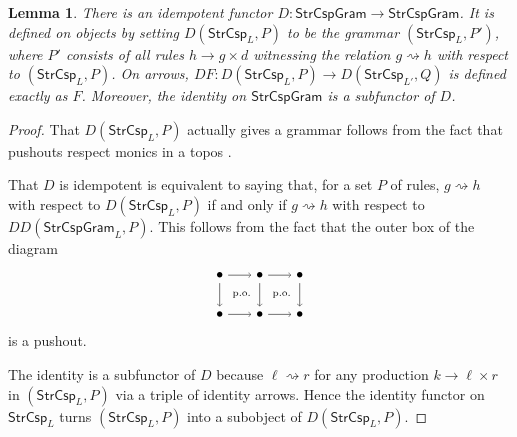 \documentclass{amsart}
\newcommand{\StrCsp}{\cat{StrCsp}}
\newcommand{\StrCspGram}{\cat{StrCspGram}}
\newcommand{\cat}[1]{\mathsf{#1}}
\newcommand{\from}{\colon}
\newcommand{\dderiv}[2]{#1 \rightsquigarrow #2}
\newcommand{\spn}[3]{#2 \to #1 \times #3}
\newtheorem{lemma}[theorem]{Lemma}
\theoremstyle{remark}
\theoremstyle{definition}
\begin{document}
\begin{lemma}
  There is an idempotent functor
  $ D \from \StrCspGram \to \StrCspGram $. It is defined on objects by
  setting $ D ( \StrCsp_L , P ) $ to be the grammar
  $ ( \StrCsp_L , P') $, where $ P' $ consists of all rules
  $ \spn{g}{h}{d} $ witnessing the relation $ \dderiv{g}{h} $ with
  respect to $ ( \StrCsp_L , P ) $. On arrows,
  $ DF \from D( \StrCsp_L , P ) \to D( \StrCsp_{L'} , Q ) $ is defined
  exactly as $ F $.  Moreover, the identity on $ \StrCspGram $ is a
  subfunctor of $ D $.
\end{lemma}

%
% 

\begin{proof}
  That $ D ( \StrCsp_L , P ) $ actually gives a grammar follows from the
  fact that pushouts respect monics in a topos
  \cite[Lem.~12]{LackSobo_Adhesive}.
  
  That $ D $ is idempotent is equivalent to saying that, for a set
  $ P $ of rules, $ \dderiv{g}{h} $ with respect to
  $ D ( \StrCsp_L , P ) $ if and only if $ \dderiv{g}{h} $ with
  respect to $ DD ( \StrCspGram_L , P ) $. This follows from the fact
  that the outer box of the diagram
    \[
      \begin{tikzpicture}
        \node (1) at (0,1) {\( \bullet \)};
        \node (2) at (1,1) {\( \bullet \)};
        \node (3) at (2,1) {\( \bullet \)};
        \node (4) at (0,0) {\( \bullet \)};
        \node (5) at (1,0) {\( \bullet \)};
        \node (6) at (2,0) {\( \bullet \)};
        \draw [->] (1) to node [] {\scriptsize{\(  \)}} (2);
        \draw [->] (2) to node [] {\scriptsize{\(  \)}} (3);
        \draw [->] (4) to node [] {\scriptsize{\(  \)}} (5);
        \draw [->] (5) to node [] {\scriptsize{\(  \)}} (6);
        \draw [->] (1) to node [] {\scriptsize{\(  \)}} (4);
        \draw [->] (2) to node [] {\scriptsize{\(  \)}} (5);
        \draw [->] (3) to node [] {\scriptsize{\(  \)}} (6);
        \node () at (0.5,0.5) {\scriptsize{ p.o.\ }};
        \node () at (1.5,0.5) {\scriptsize{ p.o.\ }};
      \end{tikzpicture}
    \]
    is a pushout.

    The identity is a subfunctor of $ D $ because $ \dderiv{\ell}{r} $
    for any production $ \spn{\ell }{k}{r} $ in $ ( \StrCsp_L , P ) $
    via a triple of identity arrows. Hence the identity functor on
    $ \StrCsp_L $ turns $ ( \StrCsp_L , P ) $ into a subobject of
    $ D ( \StrCsp_L , P ) $.
\end{proof}
\end{document}
